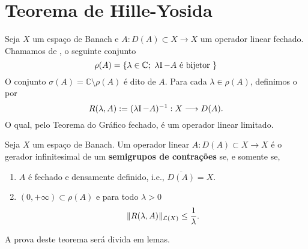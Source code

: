 \section{Teorema de Hille-Yosida}



\begin{definition}
Seja $X$ um espaço de Banach e $A:D(A)\subset X\longrightarrow X$ um operador linear fechado. Chamamos de ,  o seguinte conjunto
\[\rho(A)=\{\lambda \in \mathbb{C};\ \lambda \operatorname{\!I} -A \text{ é bijetor }\}\]
O conjunto $\sigma(A)=\mathbb{C}\setminus\rho(A)$ é dito   de $A$. Para cada $\lambda\in \rho(A)$, definimos o    por
\[R(\lambda,A):=(\lambda \operatorname{\!I} -A)^{-1}: X\longrightarrow D(A).\]
O qual, pelo Teorema do Gráfico fechado, é um operador linear limitado. 

\end{definition}

\begin{theorem}
Seja $X$ um espaço de Banach. Um operador linear $A:D(A)\subset X\longrightarrow X$ é o gerador infinitesimal de um 
\textbf{semigrupos de contrações} se, e somente se, 
\begin{enumerate}[$(i)$]
\item $A$ é fechado e densamente definido, i.e., $\overline{D(A)}=X$. 
\item $(0,+\infty)\subset \rho(A)$ e para todo $\lambda>0$
\begin{equation*}
\|R(\lambda,A)\|_{\mathcal{L}(X)}\leq \frac{1}{\lambda}.
\end{equation*}
\end{enumerate}
\end{theorem}

A prova deste teorema será divida em  lemas.


